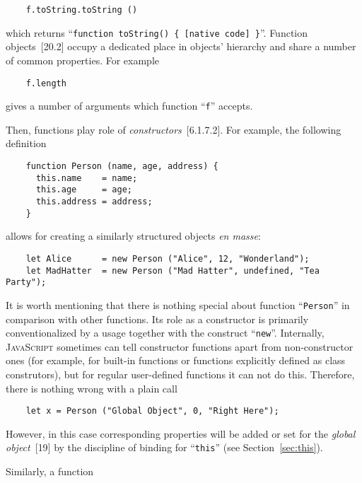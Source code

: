 \documentclass{article}
\newcommand{\js}{\textsc{JavaScript}\xspace}
\newcommand{\rf}[1]{[\textsc{#1}]}
\begin{document}
\begin{lstlisting}
    f.toString.toString ()
\end{lstlisting}

which returns ``\lstinline|function toString() { [native code] }|''. Function objects~\rf{20.2} occupy a dedicated place in objects' hierarchy
and share a number of common properties. For example

\begin{lstlisting}
    f.length
\end{lstlisting}

gives a number of arguments which function ``\lstinline|f|'' accepts.

Then, functions play role of \emph{constructors}~\rf{6.1.7.2}. For example, the following definition

\begin{lstlisting}
    function Person (name, age, address) {
      this.name    = name;
      this.age     = age;
      this.address = address;
    }
\end{lstlisting}

allows for creating a similarly structured objects \emph{en masse}:

\begin{lstlisting}
    let Alice      = new Person ("Alice", 12, "Wonderland");
    let MadHatter  = new Person ("Mad Hatter", undefined, "Tea Party");  
\end{lstlisting}

It is worth mentioning that there is nothing special about function ``\lstinline|Person|'' in
comparison with other functions. Its role as a constructor is primarily conventionalized
by a usage together with the construct ``\lstinline|new|''. Internally, \js sometimes can
tell constructor functions apart from non-constructor ones (for example, for built-in functions or
functions explicitly defined as class construtors), but for regular user-defined functions
it can not do this. Therefore, there is nothing wrong with a plain call

\begin{lstlisting}
    let x = Person ("Global Object", 0, "Right Here");
\end{lstlisting}

However, in this case corresponding properties will be added or set for the \emph{global object}~\rf{19} by
the discipline of binding for ``\lstinline|this|'' (see Section~\ref{sec:this}).

Similarly, a function
\end{document}
